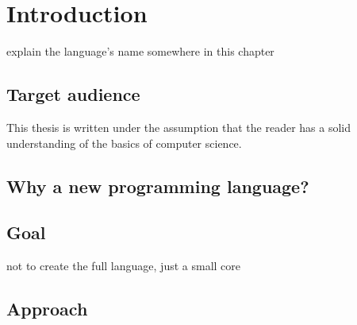 \chapter{Introduction} %

explain the language's name somewhere in this chapter

    \section{Target audience}
    This thesis is written under the assumption that the reader has a solid understanding of the basics of computer science.
    
    
    \section{Why a new programming language?}
    
    
    \section{Goal} %
    
    not to create the full language, just a small core
    
    
    \section{Approach} %
